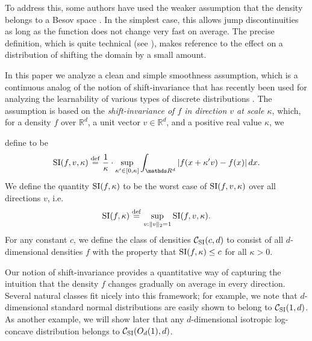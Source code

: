 To address this, some authors have used the weaker assumption that the
density belongs to a Besov space
\citep{besov1959family,devore1993besov,masry1997multivariate,willett2007multiscale,acharya2017sample}.
In the simplest case, this allows jump discontinuities as long as the
function does not change very fast on average.  The precise definition,
which is quite technical (see \cite{devore1993besov}),
makes reference to the effect on a distribution of shifting the domain
by a small amount.

\medskip
{}
In this paper we analyze 
a clean and simple smoothness
assumption, which is a continuous analog of the notion of
shift-invariance that has recently been used for analyzing the
learnability of various types of discrete distributions
\citep{barbour1999poisson,daskalakis2013learning,DLS18asums}.
The assumption is based on the {\em shift-invariance of $f$ in direction $v$ at scale $\kappa$},
which, for a density $f$ over $\mathbb{R}^d$, a unit vector $v \in \mathbb{R}^d$, and a positive real value $\kappa$, we 
define to be
\[
\si(f,v,\kappa) \eqdef 
{\frac 1 \kappa} \cdot \sup_{\kappa' \in [0,\kappa]} \int_{\R^d} \left|f(x+ \kappa'  v) - f(x)\right| dx.\]
 We define the quantity ${\mathrm{SI}}(f,\kappa)$ to be the worst case
of ${\mathrm{SI}}(f,v,\kappa)$ over all directions $v$, i.e.\ 
\[
{\mathrm{SI}}(f,\kappa) \stackrel{\rm def}{=} \sup_{v: \Vert v \Vert_2 =1} {\mathrm{SI}}(f,v,\kappa). 
\]
For any  
constant $c$,
we define the class of densities ${\mathcal C}_{\mathrm{SI}}(c, d)$  to consist of all $d$-dimensional densities $f$ with the property that ${\mathrm{SI}}(f,\kappa) \le c$ for all $\kappa > 0.$ 

Our notion of shift-invariance provides a quantitative way of capturing the intuition that the density $f$ 
changes gradually on average in every direction.
Several natural classes fit nicely into this framework; for example, we note that $d$-dimensional standard normal distributions are easily shown to belong to ${\mathcal C}_{\mathrm{SI}}(1, d)$.  As another example, we will show later that any $d$-dimensional isotropic log-concave distribution belongs to ${\mathcal C}_{\mathrm{SI}}(O_d(1),d)$.





